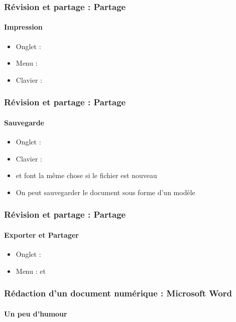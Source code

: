 \documentclass[xcolor=table]{beamer}
\begin{document}
\begin{frame}
\frametitle{Révision et partage : Partage}
\framesubtitle{Impression}

\begin{minipage}{0.61\textwidth}
	\begin{itemize}
		\item Onglet : 
		\item Menu : 
		\item Clavier : 
	\end{itemize}
\end{minipage}
\begin{minipage}{0.38\textwidth}
\end{minipage}

\end{frame}

\begin{frame}
\frametitle{Révision et partage : Partage}
\framesubtitle{Sauvegarde}

\begin{minipage}{0.61\textwidth}
	\begin{itemize}
		\item Onglet : 
		\item Clavier : 
		\item {} et  font la même chose si le fichier est nouveau 
		\item On peut sauvegarder le document sous forme d'un modèle 
	\end{itemize}
\end{minipage}
\begin{minipage}{0.38\textwidth}
\end{minipage}

\end{frame}

\begin{frame}
\frametitle{Révision et partage : Partage}
\framesubtitle{Exporter et Partager}

\begin{minipage}{0.38\textwidth}
	\begin{itemize}
		\item Onglet : 
		\item Menu :  et 
	\end{itemize}
\end{minipage}
\begin{minipage}{0.30\textwidth}
\end{minipage}
\begin{minipage}{0.30\textwidth}
\end{minipage}

\end{frame}

\begin{frame}
\frametitle{Rédaction d'un document numérique : Microsoft Word}
\framesubtitle{Un peu d'humour}


\end{frame}

\end{document}
